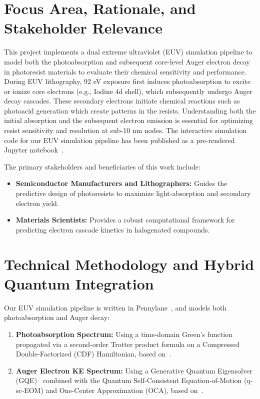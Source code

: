 \documentclass[11pt]{article}
\begin{document}


\section{Focus Area, Rationale, and Stakeholder Relevance}
This project implements a dual extreme ultraviolet (EUV) simulation pipeline to model both the photoabsorption and subsequent core-level Auger electron decay in photoresist materials to evaluate their chemical sensitivity and performance. During EUV lithography, 92 eV exposure first induces photoabsorption to excite or ionize core electrons (e.g., Iodine 4d shell), which subsequently undergo Auger decay cascades. These secondary electrons initiate chemical reactions such as photoacid generation which create patterns in the resists. Understanding both the initial absorption and the subsequent electron emission is essential for optimizing resist sensitivity and resolution at sub-10 nm nodes. The interactive simulation code for our EUV simulation pipeline has been published as a pre-rendered Jupyter notebook~\cite{mb_notebook}.

The primary stakeholders and beneficiaries of this work include:
\begin{itemize}[leftmargin=*,noitemsep,topsep=0pt]
  \item \textbf{Semiconductor Manufacturers and Lithographers:} Guides the predictive design of photoresists to maximize light-absorption and secondary electron yield.
  \item \textbf{Materials Scientists:} Provides a robust computational framework for predicting electron cascade kinetics in halogenated compounds.
\end{itemize}

\section{Technical Methodology and Hybrid Quantum Integration}
Our EUV simulation pipeline is written in Pennylane~\cite{pennylane2018}, and models both photoabsorption and Auger decay:
\begin{enumerate}[leftmargin=*,noitemsep,topsep=0pt]
  \item \textbf{Photoabsorption Spectrum:} Using a time-domain Green's function propagated via a second-order Trotter product formula on a Compressed Double-Factorized (CDF) Hamiltonian, based on~\cite{kharazi2026}.
  \item \textbf{Auger Electron KE Spectrum:} Using a Generative Quantum Eigensolver (GQE)~\cite{gqe2024} combined with the Quantum Self-Consistent Equation-of-Motion (q-sc-EOM) and One-Center Approximation (OCA), based on~\cite{keithley2026}.
\end{enumerate}
\end{document}
